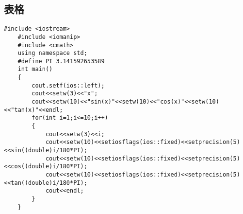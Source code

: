 \documentclass[UTF8]{ctexart}
\begin{document}
\subsection{表格}
\begin{lstlisting}[language={[ANSI]C++}]
    #include <iostream>
    #include <iomanip>
    #include <cmath>
    using namespace std;
    #define PI 3.141592653589
    int main()
    {
        cout.setf(ios::left);
        cout<<setw(3)<<"x";
        cout<<setw(10)<<"sin(x)"<<setw(10)<<"cos(x)"<<setw(10)<<"tan(x)"<<endl;
        for(int i=1;i<=10;i++)
        {
            cout<<setw(3)<<i;
            cout<<setw(10)<<setiosflags(ios::fixed)<<setprecision(5)<<sin((double)i/180*PI);
            cout<<setw(10)<<setiosflags(ios::fixed)<<setprecision(5)<<cos((double)i/180*PI); 
            cout<<setw(10)<<setiosflags(ios::fixed)<<setprecision(5)<<tan((double)i/180*PI);              
            cout<<endl;
        }
    }
\end{lstlisting}
\end{document}
